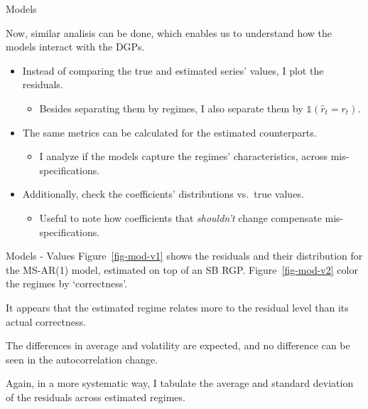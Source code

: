 \documentclass[
  ignorenonframetext,
]{beamer}
\providecommand{\tightlist}{%
  \setlength{\itemsep}{0pt}\setlength{\parskip}{0pt}}\usepackage{longtable,booktabs,array}
\begin{document}
\begin{frame}{Models}
\label{models}

Now, similar analisis can be done, which enables us to understand how
the models interact with the DGPs.

\begin{itemize}
\tightlist
\item
  Instead of comparing the true and estimated series' values, I plot the
  residuals.

  \begin{itemize}
  \tightlist
  \item
    Besides separating them by regimes, I also separate them by
    \(\mathbb{1}(\hat{r}_t = r_t)\).
  \end{itemize}
\item
  The same metrics can be calculated for the estimated counterparts.

  \begin{itemize}
  \tightlist
  \item
    I analyze if the models capture the regimes' characteristics, across
    mis-specifications.
  \end{itemize}
\item
  Additionally, check the coefficients' distributions vs.~true values.

  \begin{itemize}
  \tightlist
  \item
    Useful to note how coefficients that \emph{shouldn't} change
    compensate mis-specifications.
  \end{itemize}
\end{itemize}
\end{frame}

\begin{frame}{Models - Values}
\label{models---values}
Figure~\ref{fig-mod-v1} shows the residuals and their distribution for
the MS-AR(1) model, estimated on top of an SB RGP.
Figure~\ref{fig-mod-v2} color the regimes by `correctness'.

It appears that the estimated regime relates more to the residual level
than its actual correctness.

The differences in average and volatility are expected, and no
difference can be seen in the autocorrelation change.

Again, in a more systematic way, I tabulate the average and standard
deviation of the residuals across estimated regimes.
\end{frame}
\end{document}
